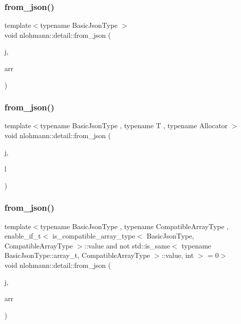 \subsubsection{\texorpdfstring{from\_json()}{from\_json()}\hspace{0.1cm}{\footnotesize\ttfamily [7/11]}}
{\footnotesize\ttfamily template$<$typename Basic\+Json\+Type $>$ \\
void nlohmann\+::detail\+::from\+\_\+json (\begin{DoxyParamCaption}\item[{const Basic\+Json\+Type \&}]{j,  }\item[{typename Basic\+Json\+Type\+::array\+\_\+t \&}]{arr }\end{DoxyParamCaption})}

\mbox{\label{namespacenlohmann_1_1detail_a7fb5b5b8034d347b702d31d7fec4ecd7}} 
\subsubsection{\texorpdfstring{from\_json()}{from\_json()}\hspace{0.1cm}{\footnotesize\ttfamily [8/11]}}
{\footnotesize\ttfamily template$<$typename Basic\+Json\+Type , typename T , typename Allocator $>$ \\
void nlohmann\+::detail\+::from\+\_\+json (\begin{DoxyParamCaption}\item[{const Basic\+Json\+Type \&}]{j,  }\item[{std\+::forward\+\_\+list$<$ T, Allocator $>$ \&}]{l }\end{DoxyParamCaption})}

\mbox{\label{namespacenlohmann_1_1detail_a8dcac00852dbe1f61d1e78135b19d428}} 
\subsubsection{\texorpdfstring{from\_json()}{from\_json()}\hspace{0.1cm}{\footnotesize\ttfamily [9/11]}}
{\footnotesize\ttfamily template$<$typename Basic\+Json\+Type , typename Compatible\+Array\+Type , enable\+\_\+if\+\_\+t$<$ is\+\_\+compatible\+\_\+array\+\_\+type$<$ Basic\+Json\+Type, Compatible\+Array\+Type $>$\+::value and not std\+::is\+\_\+same$<$ typename Basic\+Json\+Type\+::array\+\_\+t, Compatible\+Array\+Type $>$\+::value, int $>$  = 0$>$ \\
void nlohmann\+::detail\+::from\+\_\+json (\begin{DoxyParamCaption}\item[{const Basic\+Json\+Type \&}]{j,  }\item[{Compatible\+Array\+Type \&}]{arr }\end{DoxyParamCaption})}

